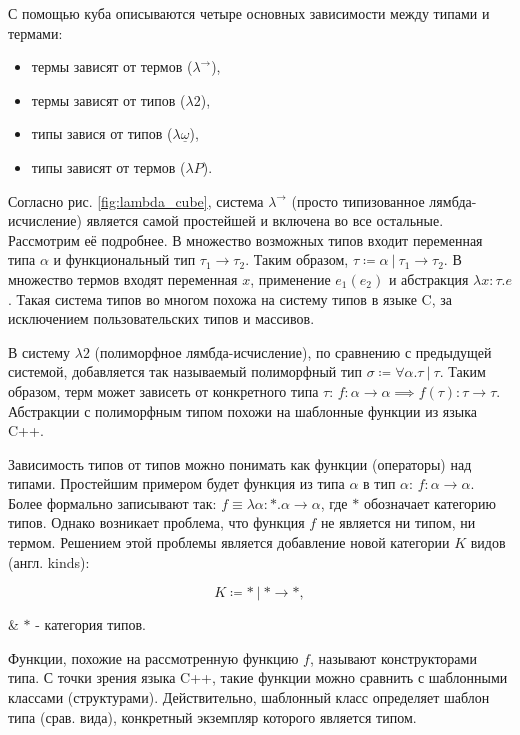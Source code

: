 С помощью куба описываются четыре основных зависимости между типами и термами:
\begin{itemize}
    \item термы зависят от термов ($\lambda^{\to}$),
    \item термы зависят от типов ($\lambda 2$),
    \item типы завися от типов ($\lambda \underline{\omega}$),
    \item типы зависят от термов ($\lambda P$).
\end{itemize}

Согласно рис. \ref{fig:lambda_cube}, система $\lambda^{\to}$ (просто типизованное лямбда-исчисление) является самой простейшей и включена во все остальные.
Рассмотрим её подробнее.
В множество возможных типов входит переменная типа $\alpha$ и функциональный тип $\tau_1 \to \tau_2$.
Таким образом, $\tau \coloneqq \alpha ~|~ \tau_1 \to \tau_2$.
В множество термов входят переменная $x$, применение $e_1(e_2)$ и абстракция $\lambda x: \tau. e$.
Такая система типов во многом похожа на систему типов в языке C, за исключением пользовательских типов и массивов.

В систему $\lambda 2$ (полиморфное лямбда-исчисление), по сравнению с предыдущей системой, добавляется так называемый полиморфный тип $\sigma \coloneqq \forall \alpha. \tau ~|~ \tau$.
Таким образом, терм может зависеть от конкретного типа $\tau$: $f: \alpha \to \alpha \implies f(\tau): \tau \to \tau$.
Абстракции с полиморфным типом похожи на шаблонные функции из языка C++.

Зависимость типов от типов можно понимать как функции (операторы) над типами.
Простейшим примером будет функция из типа $\alpha$ в тип $\alpha$: $f: \alpha \to \alpha$.
Более формально записывают так: $f \equiv \lambda \alpha: *. \alpha \to \alpha$, где $*$ обозначает категорию типов.
Однако возникает проблема, что функция $f$ не является ни типом, ни термом.
Решением этой проблемы является добавление новой категории $K$ видов (англ. kinds):

\begin{equation}
    \label{eq:kinds}
    K \coloneqq * ~|~ * \to *,
\end{equation}
\begin{eqrem}
    & $*$ - категория типов.
\end{eqrem}

Функции, похожие на рассмотренную функцию $f$, называют конструкторами типа.
С точки зрения языка C++, такие функции можно сравнить с шаблонными классами (структурами).
Действительно, шаблонный класс определяет шаблон типа (срав. вида), конкретный экземпляр которого является типом.

